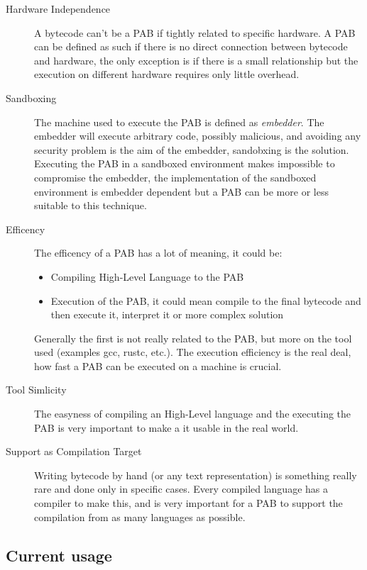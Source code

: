 \documentclass[../main.tex]{subfiles}
\begin{document}
\begin{description}
  \item[Hardware Independence] \hfill
        A bytecode can't be a PAB if tightly related to specific hardware. A PAB can be defined as such if there is no direct connection between bytecode and hardware, the only exception is if there is a small relationship but the execution on different hardware requires only little overhead.
  \item[Sandboxing] \hfill
        The machine used to execute the PAB is defined as \textit{embedder}. The embedder will execute arbitrary code, possibly malicious, and avoiding any security problem is the aim of the embedder, sandobxing is the solution.
        Executing the PAB in a sandboxed environment makes impossible to compromise the embedder, the implementation of the sandboxed environment is embedder dependent but a PAB can be more or less suitable to this technique.
  \item[Efficency] \hfill
        The efficency of a PAB has a lot of meaning, it could be:

        \begin{itemize}
          \item Compiling High-Level Language to the PAB
          \item Execution of the PAB, it could mean compile to the final bytecode and then execute it, interpret it or more complex solution
        \end{itemize}

        Generally the first is not really related to the PAB, but more on the tool used (examples gcc, rustc, etc.). The execution efficiency is the real deal, how fast a PAB can be executed on a machine is crucial.
  \item[Tool Simlicity] \hfill
        The easyness of compiling an High-Level language and the executing the PAB is very important to make a it usable in the real world.
  \item[Support as Compilation Target] \hfill
        Writing bytecode by hand (or any text representation) is something really rare and done only in specific cases. Every compiled language has a compiler to make this, and is very important for a PAB to support the compilation from as many languages as possible.
\end{description}

\subsection{Current usage}
\end{document}
